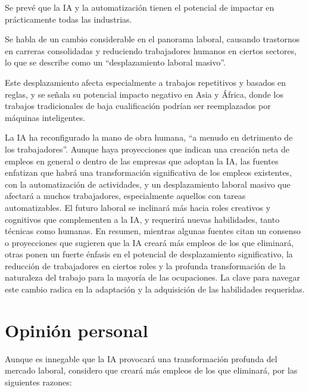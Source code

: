 \documentclass[12pt, a4paper, twoside]{article}
\begin{document}
Se prevé que la IA y la automatización tienen el potencial de impactar en prácticamente todas las industrias\cite{tenes2023impacto}.

Se habla de un cambio considerable en el panorama laboral, causando trastornos en carreras consolidadas y reduciendo trabajadores 
humanos en ciertos sectores, lo que se describe como un ``desplazamiento laboral masivo''\cite{tenes2023impacto}.

Este desplazamiento afecta especialmente a trabajos repetitivos y basados en reglas, y se señala su potencial impacto negativo en 
Asia y África, donde los trabajos tradicionales de baja cualificación podrían ser reemplazados por máquinas inteligentes\cite{tenes2023impacto}.

La IA ha reconfigurado la mano de obra humana, ``a menudo en detrimento de los trabajadores''\cite{tenes2023impacto}.
Aunque haya proyecciones que indican una creación neta de empleos en general o dentro de las empresas que adoptan la IA\cite{rouhiainen2018inteligencia}\cite{tenes2023impacto}, las fuentes 
enfatizan que habrá una transformación significativa de los empleos existentes\cite{martinez2020tecnologias}, con la automatización de actividades, y un desplazamiento 
laboral masivo que afectará a muchos trabajadores, especialmente aquellos con tareas automatizables. El futuro laboral se inclinará más 
hacia roles creativos y cognitivos que complementen a la IA, y requerirá nuevas habilidades, tanto técnicas como humanas\cite{tenes2023impacto}.
En resumen, mientras algunas fuentes citan un consenso o proyecciones que sugieren que la IA creará más empleos de los que eliminará, 
otras ponen un fuerte énfasis en el potencial de desplazamiento significativo, la reducción de trabajadores en ciertos roles y la profunda 
transformación de la naturaleza del trabajo para la mayoría de las ocupaciones. La clave para navegar este cambio radica en la adaptación y 
la adquisición de las habilidades requeridas.

\section{Opinión personal}

Aunque es innegable que la IA provocará una transformación profunda del mercado laboral, considero que creará más empleos de los que eliminará, por las siguientes razones:
\end{document}
